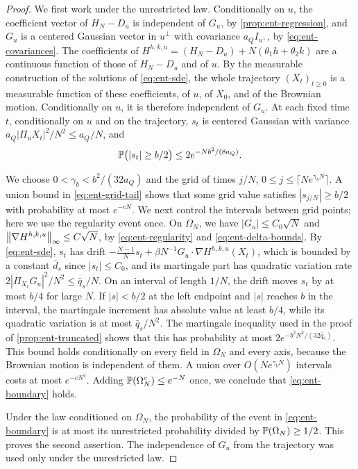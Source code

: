 \begin{proof}
We first work under the unrestricted law. Conditionally on $u$, the
coefficient vector of $H_N-D_u$ is independent of $G_u$, by
\cref{prop:ent-regression}, and $G_u$ is a centered Gaussian vector in
$u^\perp$ with covariance $a_QI_{u^\perp}$, by \eqref{eq:ent-covariances}.
The coefficients of $H^{h,k,u}=(H_N-D_u)+N(\theta_1h+\theta_2k)$ are a
continuous function of those of $H_N-D_u$ and of $u$. By the measurable
construction of the solutions of \eqref{eq:ent-sde}, the whole trajectory
$(X_t)_{t\ge0}$ is a measurable function of these coefficients, of $u$, of
$X_0$, and of the Brownian motion. Conditionally on $u$, it is therefore
independent of $G_u$. At each fixed time $t$, conditionally on $u$ and on
the trajectory, $s_t$ is centered Gaussian with variance
$a_Q|\Pi_uX_t|^2/N^2\le a_Q/N$, and
\begin{equation}\label{eq:ent-grid-tail}
 \mathbb P\bigl(|s_t|\ge b/2\bigr)\le2e^{-Nb^2/(8a_Q)} .
\end{equation}

We choose $0<\gamma_b<b^2/(32a_Q)$ and the grid of times $j/N$,
$0\le j\le\lceil Ne^{\gamma_bN}\rceil$. A union bound in
\eqref{eq:ent-grid-tail} shows that some grid value satisfies
$|s_{j/N}|\ge b/2$ with probability at most $e^{-cN}$. We next control the
intervals between grid points; here we use the regularity event once. On
$\Omega_N$, we have $|G_u|\le C_0\sqrt N$ and $\left\lVert\nabla H^{h,k,u}\right\rVert_\infty
\le C\sqrt N$, by \eqref{eq:ent-regularity} and
\eqref{eq:ent-delta-bounds}. By \eqref{eq:ent-sde}, $s_t$ has drift
$-\frac{N-1}{N}s_t+\beta N^{-1}G_u\cdot\nabla H^{h,k,u}(X_t)$, which is
bounded by a constant $\bar d_s$ since $|s_t|\le C_0$, and its martingale part
has quadratic variation rate $2|\Pi_{X_t}G_u|^2/N^2\le\bar q_s/N$. On an
interval of length $1/N$, the drift moves $s_t$ by at most $b/4$ for large
$N$. If $|s|<b/2$ at the left endpoint and $|s|$ reaches $b$ in the interval,
the martingale increment has absolute value at least $b/4$, while its
quadratic variation is at most $\bar q_s/N^2$. The martingale inequality used
in the proof of \cref{prop:ent-truncated} shows that this has probability at most
$2e^{-b^2N^2/(32\bar q_s)}$. This bound holds conditionally on every field in
$\Omega_N$ and every axis, because the Brownian motion is independent of
them. A union over $O(Ne^{\gamma_bN})$ intervals costs at most $e^{-cN^2}$.
Adding $\mathbb P(\Omega_N^c)\le e^{-N}$ once, we conclude that
\eqref{eq:ent-boundary} holds.

Under the law conditioned on $\Omega_N$, the probability of the event in
\eqref{eq:ent-boundary} is at most its unrestricted probability divided by
$\mathbb P(\Omega_N)\ge1/2$. This proves the second assertion. The independence of
$G_u$ from the trajectory was used only under the unrestricted law.
\end{proof}

